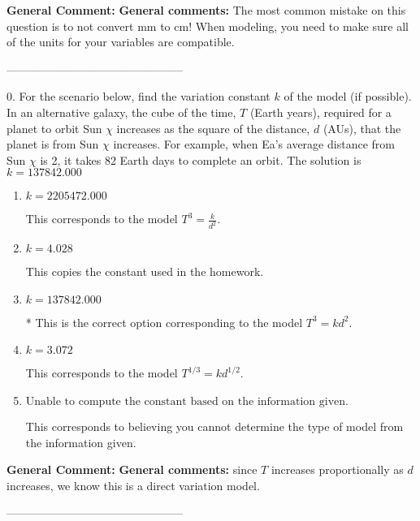 \documentclass{extbook}[14pt]
\begin{document}
\textbf{General Comment:} \textbf{General comments:} The most common mistake on this question is to not convert mm to cm! When modeling, you need to make sure all of the units for your variables are compatible. 

-----------------------------------------------

0. For the scenario below, find the variation constant $k$ of the model (if possible).
In an alternative galaxy, the cube of the time, $T$ (Earth years), required for a planet to orbit Sun $\chi$ increases as the square of the distance, $d$ (AUs), that the planet is from Sun $\chi$ increases. For example, when Ea's average distance from Sun $\chi$ is 2, it takes 82 Earth days to complete an orbit. 
The solution is $ k = 137842.000 $ 

\begin{enumerate}[label=\Alph*.] 
\item $ k = 2205472.000 $ 

 This corresponds to the model $T^{3} = \frac{k}{d^{2}}$. 
\item $ k = 4.028 $ 

 This copies the constant used in the homework. 
\item $ k = 137842.000 $ 

 * This is the correct option corresponding to the model $T^{3} = k d^{2}$. 
\item $ k = 3.072 $ 

 This corresponds to the model $T^{1/3} = k d^{1/2}$. 
\item $ \text{Unable to compute the constant based on the information given.} $ 

 This corresponds to believing you cannot determine the type of model from the information given. 
\end{enumerate} 
 
\textbf{General Comment:} \textbf{General comments:} since $T$ increases proportionally as $d$ increases, we know this is a direct variation model. 

-----------------------------------------------
\end{document}
